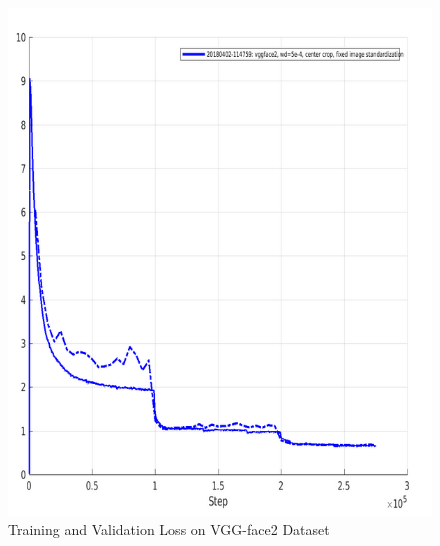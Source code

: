 \documentclass[a4paper,12pt, twoside]{NITKReport}
\begin{document}
\begin{figure}
\begin{minipage}[b]{0.4\textwidth}
    \includegraphics[width=\textwidth]{vgg_loss.png}
    \caption{Training and Validation Loss on VGG-face2 Dataset}
    \label{vggface_loss}
  \end{minipage}
\end{figure}
\newpage
\end{document}
